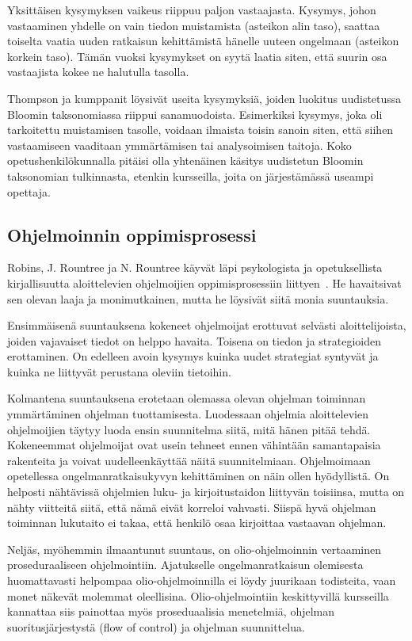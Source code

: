 \documentclass[finnish]{../tktltiki2}
\theoremstyle{definition}
\theoremstyle{remark}
\begin{document}
Yksittäisen kysymyksen vaikeus riippuu paljon vastaajasta. Kysymys, johon vastaaminen yhdelle on vain tiedon muistamista (asteikon alin taso), saattaa toiselta vaatia uuden ratkaisun kehittämistä hänelle uuteen ongelmaan (asteikon korkein taso). Tämän vuoksi kysymykset on syytä laatia siten, että suurin osa vastaajista kokee ne halutulla tasolla.

Thompson ja kumppanit löysivät useita kysymyksiä, joiden luokitus uudistetussa Bloomin taksonomiassa riippui sanamuodoista. Esimerkiksi kysymys, joka oli tarkoitettu muistamisen tasolle, voidaan ilmaista toisin sanoin siten, että siihen vastaamiseen vaaditaan ymmärtämisen tai analysoimisen taitoja. Koko opetushenkilökunnalla pitäisi olla yhtenäinen käsitys uudistetun Bloomin taksonomian tulkinnasta, etenkin kursseilla, joita on järjestämässä useampi opettaja.

\subsection{Ohjelmoinnin oppimisprosessi}

Robins, J. Rountree ja N. Rountree käyvät läpi psykologista ja opetuksellista kirjallisuutta aloittelevien ohjelmoijien oppimisprosessiin liittyen~\cite{RRR03}. He havaitsivat sen olevan laaja ja monimutkainen, mutta he löysivät siitä monia suuntauksia.

Ensimmäisenä suuntauksena kokeneet ohjelmoijat erottuvat selvästi aloittelijoista, joiden vajavaiset tiedot on helppo havaita. Toisena on tiedon ja strategioiden erottaminen. On edelleen avoin kysymys kuinka uudet strategiat syntyvät ja kuinka ne liittyvät perustana oleviin tietoihin.

Kolmantena suuntauksena erotetaan olemassa olevan ohjelman toiminnan ymmärtäminen ohjelman tuottamisesta. Luodessaan ohjelmia aloittelevien ohjelmoijien täytyy luoda ensin suunnitelma siitä, mitä hänen pitää tehdä. Kokeneemmat ohjelmoijat ovat usein tehneet ennen vähintään samantapaisia rakenteita ja voivat uudelleenkäyttää näitä suunnitelmiaan. Ohjelmoimaan opetellessa ongelmanratkaisukyvyn kehittäminen on näin ollen hyödyllistä. On helposti nähtävissä ohjelmien luku- ja kirjoitustaidon liittyvän toisiinsa, mutta on nähty viitteitä siitä, että nämä eivät korreloi vahvasti. Siispä hyvä ohjelman toiminnan lukutaito ei takaa, että henkilö osaa kirjoittaa vastaavan ohjelman.

Neljäs, myöhemmin ilmaantunut suuntaus, on olio-ohjelmoinnin vertaaminen proseduraaliseen ohjelmointiin. Ajatukselle ongelmanratkaisun olemisesta huomattavasti helpompaa olio-ohjelmoinnilla ei löydy juurikaan todisteita, vaan monet näkevät molemmat oleellisina. Olio-ohjelmointiin keskittyvillä kursseilla kannattaa siis painottaa myös proseduaalisia menetelmiä, ohjelman suoritusjärjestystä (flow of control) ja ohjelman suunnittelua.
\end{document}
